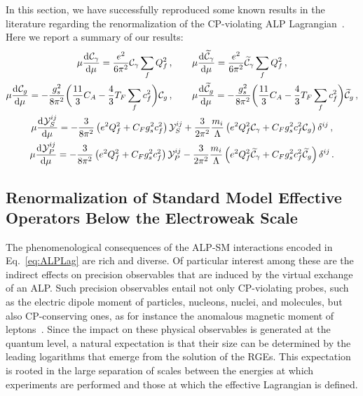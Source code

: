 In this section, we have successfully reproduced some known results in the literature regarding
the renormalization of the CP-violating ALP
Lagrangian~\cite{Bauer:2021mvw,Chala:2020wvs,DasBakshi:2023lca}.
Here we report a summary of our results:
\begin{gather}
    \mu\dv[]{\mathcal C_\gamma}{\mu} = \frac{e^2}{6\pi^2}\mathcal C_\gamma \sum_f Q_f^2\,,
    \qquad
    \mu\dv[]{\widetilde{\mathcal C}_\gamma}{\mu} = \frac{e^2}{6\pi^2}\widetilde{\mathcal C}_\gamma \sum_f Q_f^2\,,
    \\
    \mu\dv[]{\mathcal C_g}{\mu} = -\frac{g_s^2}{8\pi^2} \bigg(\frac{11}{3} C_A - \frac{4}{3}T_F \sum_f c_f^2\bigg) \mathcal C_g\,,
    \qquad
    \mu\dv[]{\widetilde{\mathcal C}_g}{\mu} = -\frac{g_s^2}{8\pi^2} \bigg(\frac{11}{3} C_A - \frac{4}{3}T_F \sum_f c_f^2\bigg) \widetilde{\mathcal C}_g \,,
    \\
    \mu\dv[]{\mathcal Y_S^{ij}}{\mu} = -\frac{3}{8\pi^2}\left(e^2Q_f^2+C_Fg_s^2c_f^2 \right)\mathcal Y_S^{ij} + \frac{3}{2\pi^2}\frac{m_i}{\Lambda}\left(e^2Q_f^2 \mathcal C_\gamma + C_F g_s^2 c_f^2 \mathcal C_g\right)\delta^{ij}\,,\\
    \mu\dv[]{\mathcal Y_P^{ij}}{\mu} = -\frac{3}{8\pi^2}\left(e^2Q_f^2 +C_Fg_s^2c_f^2 \right)\mathcal Y_P^{ij} - \frac{3}{2\pi^2}\frac{m_i}{\Lambda}\left(e^2Q_f^2 \widetilde{\mathcal C}_\gamma + C_F g_s^2 c_f^2 \widetilde{\mathcal C}_g\right)\delta^{ij}\,.
\end{gather}

\subsection{Renormalization of Standard Model Effective Operators Below the Electroweak Scale}
\label{sec:ALPLEFT}

The phenomenological consequences of the ALP-SM interactions encoded in
Eq.~\eqref{eq:ALPLag} are rich and diverse.
Of particular interest among these are the indirect effects on precision observables that are
induced by the virtual exchange of an ALP.
Such precision observables entail not only CP-violating probes, such as the electric dipole
moment of particles, nucleons, nuclei, and molecules, but also CP-conserving ones, as for
instance the anomalous magnetic moment of leptons~\cite{Marciano:2016yhf,DiLuzio:2020oah}.
Since the impact on these physical observables is generated at the quantum level, a natural
expectation is that their size can be determined by the leading logarithms that emerge from the
solution of the RGEs.
This expectation is rooted in the large separation of scales between the energies at which
experiments are performed and those at which the effective Lagrangian is defined.

